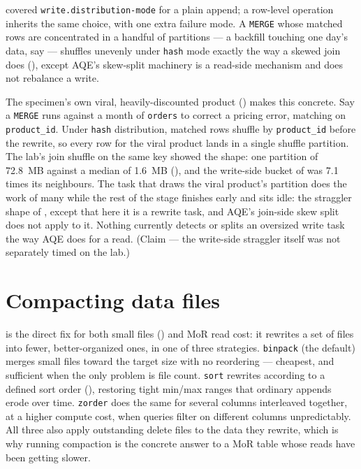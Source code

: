  covered \texttt{write.distribution-mode}
for a plain append; a row-level operation inherits the same choice, with one
extra failure mode. A \texttt{MERGE} whose matched rows are concentrated in
a handful of partitions --- a backfill touching one day's data, say ---
shuffles unevenly under \texttt{hash} mode exactly the way a skewed join
does (), except AQE's skew-split machinery is a read-side
mechanism and does not rebalance a write.

The specimen's own viral, heavily-discounted product ()
makes this concrete. Say a \texttt{MERGE} runs against a month of \texttt{orders}
to correct a pricing error, matching on \texttt{product\_id}. Under
\texttt{hash} distribution, matched rows shuffle by \texttt{product\_id} before
the rewrite, so every row for the viral product lands in a single shuffle
partition. The lab's join shuffle on the same key showed the shape: one
partition of 72.8~MB against a median of 1.6~MB (),
and the write-side bucket of  was 7.1 times its
neighbours. The task that draws the viral product's partition does the work of
many while the rest of the stage finishes early and sits idle: the straggler
shape of , except that here it is a rewrite task, and AQE's
join-side skew split does not apply to it. Nothing currently detects or splits an
oversized write task the way AQE does for a read. (Claim --- the write-side
straggler itself was not separately timed on the lab.)

\section{Compacting data files}
\label{sec:ice-write-compaction}

 is the direct fix for both small files
() and MoR read cost: it rewrites a set of files into
fewer, better-organized ones, in one of three strategies.
\texttt{binpack} (the default) merges small files toward the target size with
no reordering --- cheapest, and sufficient when the only problem is file
count. \texttt{sort} rewrites according to a defined sort order
(), restoring tight min/max ranges that ordinary
appends erode over time. \texttt{zorder} does the same for several columns
interleaved together, at a higher compute cost, when queries filter on
different columns unpredictably. All three also apply outstanding delete
files to the data they rewrite, which is why running compaction is the
concrete answer to a MoR table whose reads have been getting slower.

